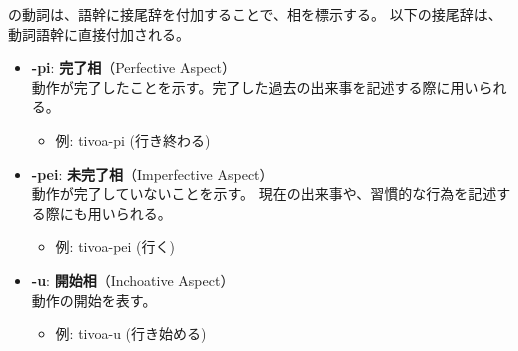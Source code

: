 \langname の動詞は、語幹に接尾辞を付加することで、相を標示する。
以下の接尾辞は、動詞語幹に直接付加される。

\begin{itemize}

    \item \textbf{-pi}: \textbf{完了相}（Perfective Aspect）\\
    動作が完了したことを示す。完了した過去の出来事を記述する際に用いられる。
    \begin{itemize}
        \item 例: tivoa-pi (行き終わる)
    \end{itemize}

    \item \textbf{-pei}: \textbf{未完了相}（Imperfective Aspect）\\
    動作が完了していないことを示す。
    現在の出来事や、習慣的な行為を記述する際にも用いられる。
    \begin{itemize}
    \item 例: tivoa-pei (行く)
    \end{itemize}

    \item \textbf{-u}: \textbf{開始相}（Inchoative Aspect）\\
    動作の開始を表す。
    \begin{itemize}
        \item 例: tivoa-u (行き始める)
    \end{itemize}

\end{itemize}